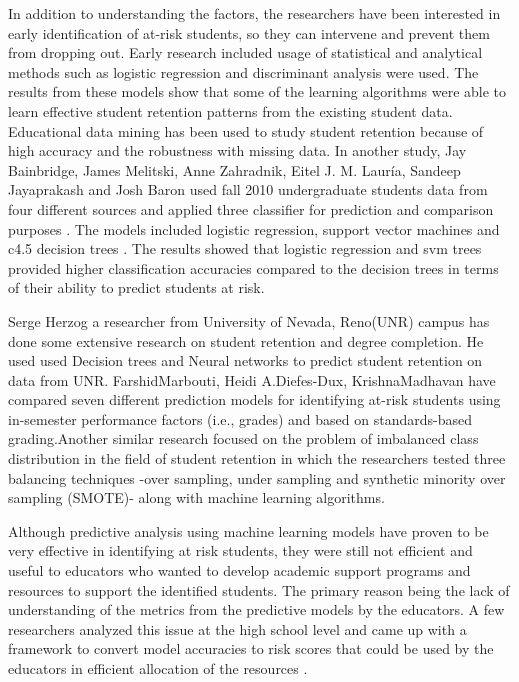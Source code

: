 \documentclass[11pt,openright]{report}
\begin{document}
In addition to understanding the factors, the researchers have been interested in early identification of at-risk students, so they can intervene and prevent them from dropping out. Early research included usage of statistical and analytical methods such as logistic regression and discriminant analysis were used\cite{lakkaraju2015machine,marbouti2016models,adejo2017}. The results from these models show that some of the learning algorithms were able to learn effective student retention patterns from the existing student data. Educational data mining has been used to study student retention because of high accuracy and the robustness with missing data\cite{alkhasawneh2014developing}. In another study, Jay Bainbridge, James Melitski, Anne Zahradnik, Eitel J. M. Lauría, Sandeep Jayaprakash and Josh Baron used fall 2010 undergraduate students data from four different sources and applied three classifier for prediction and comparison purposes \cite{bainbridge2015using}. The models included logistic regression, support vector machines and c4.5 decision trees . The results showed that logistic regression and svm trees provided higher classification accuracies compared to the decision trees in terms of their ability to predict students at risk. 

Serge Herzog a researcher from University of Nevada, Reno(UNR) campus has done some extensive research on student retention and degree completion. He used used Decision trees and Neural networks to predict student retention on data from UNR\cite{herzog2006estimating}. FarshidMarbouti, Heidi A.Diefes-Dux, KrishnaMadhavan \cite{marbouti2016models} have compared seven different prediction models for identifying at-risk students using in-semester performance factors (i.e., grades) and based on standards-based grading.Another similar research focused on the problem of imbalanced class distribution in the field of student retention in which the researchers tested three balancing techniques -over sampling, under sampling and synthetic minority over sampling (SMOTE)- along with machine learning algorithms.

Although predictive analysis using machine learning models have proven to be very effective in identifying at risk students, they were still not efficient and useful to educators who wanted to develop academic support programs and resources to support the identified students. The primary reason being the lack of understanding of the metrics from the predictive models by the educators. A few researchers analyzed this issue at the high school level and came up with a framework to convert model accuracies to risk scores that could be used  by the educators in efficient allocation of the resources \cite{lakkaraju2015machine}. 
\end{document}
